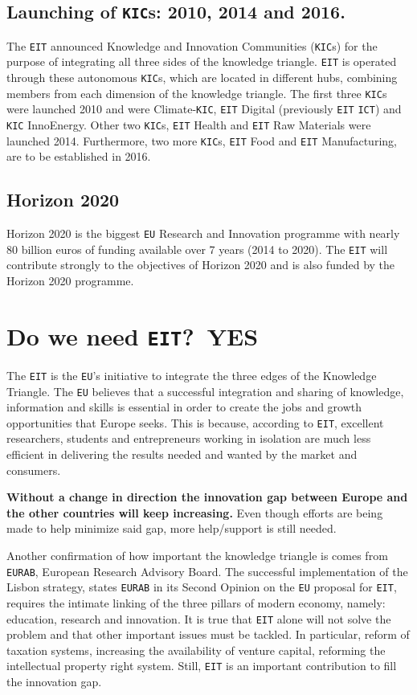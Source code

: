 \documentclass[11pt,a4paper,oneside,twocolumn]{IEEEtran}
\begin{document}
\subsection{Launching of \texttt{KIC}s: 2010, 2014 and 2016.}
The \texttt{EIT} announced Knowledge and Innovation Communities (\texttt{KIC}s) for the purpose of integrating all three sides of the knowledge triangle. \texttt{EIT} is operated through these autonomous \texttt{KIC}s, which are located in different hubs, combining members from each dimension of the knowledge triangle. The first three \texttt{KIC}s were launched 2010 and were Climate-\texttt{KIC}, \texttt{EIT} Digital (previously \texttt{EIT} \texttt{ICT}) and \texttt{KIC} InnoEnergy. Other two \texttt{KIC}s, \texttt{EIT} Health and \texttt{EIT} Raw Materials were launched 2014. Furthermore, two more \texttt{KIC}s, \texttt{EIT} Food and \texttt{EIT} Manufacturing, are to be established in 2016\cite{3_8}\cite{3_9}.

\subsection{Horizon 2020}
Horizon 2020 is the biggest \texttt{EU} Research and Innovation programme with nearly 80 billion euros of funding available over 7 years (2014 to 2020)\cite{3_6}. The \texttt{EIT} will contribute strongly to the objectives of Horizon 2020 and is also funded by the Horizon 2020 programme\cite{3_7}.


\section{Do we need \texttt{EIT}?\ YES}\label{sec:EIT-Yes}
The \texttt{EIT} is the \texttt{EU}'s initiative to integrate the three edges of the Knowledge Triangle. The \texttt{EU} believes that a successful integration and sharing of knowledge, information and skills is essential in order to create the jobs and growth opportunities that Europe seeks. This is because, according to \texttt{EIT}, excellent researchers, students and entrepreneurs working in isolation are much less efficient in delivering the results needed and wanted by the market and consumers.

\textbf{Without a change in direction the innovation gap between Europe and the other countries will keep increasing.} Even though efforts are being made to help minimize said gap, more help/support is still needed.

Another confirmation of how important the knowledge triangle is comes from \texttt{EURAB}, European Research Advisory Board. The successful implementation of the Lisbon strategy, states \texttt{EURAB} in its Second Opinion on the \texttt{EU} proposal for \texttt{EIT}, requires the intimate linking of the three pillars of modern economy, namely: education, research and innovation. It is true that \texttt{EIT} alone will not solve the problem and that other important issues must be tackled. In particular, reform of taxation systems, increasing the availability of venture capital, reforming the intellectual property right system. Still, \texttt{EIT} is an important contribution to fill the innovation gap\cite{4_1}.
\end{document}
